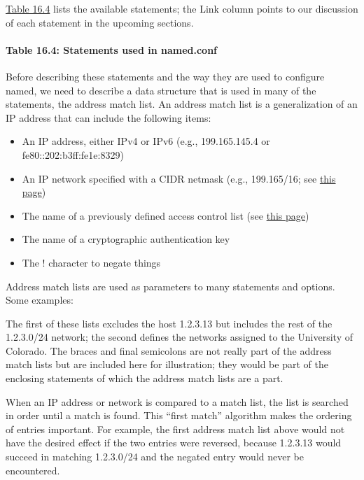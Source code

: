 \protect\hyperlink{part0024_split_035.htmlux5cux23_idTextAnchor896}{Table
16.4} lists the available statements; the Link column points to our
discussion of each statement in the upcoming sections.

\paragraph[{Table 16.4: }Statements used in
{named.conf}]{\texorpdfstring{{Table 16.4:
}\protect\hypertarget{part0024_split_035.htmlux5cux23_idTextAnchor896}{}{}Statements
used in {named.conf}}{Table 16.4: Statements used in named.conf}}


Before describing these statements and the way they are used to
configure {named}, we need to describe a data structure that is used in
many of the statements, the address match list. An address match list is
a generalization of an IP address that can include the following items:

\begin{itemize}
\tightlist
\item
  An IP address, either IPv4 or IPv6 (e.g., 199.165.145.4 or
  fe80::202:b3ff:fe1e:8329)
\item
  An IP network specified with a CIDR netmask (e.g., 199.165/16; see
  \protect\hyperlink{part0021_split_019.htmlux5cux23_idTextAnchor653}{this
  page})
\item
  The name of a previously defined access control list (see
  \protect\hyperlink{part0024_split_038.htmlux5cux23_idTextAnchor904}{this
  page})
\item
  The name of a cryptographic authentication key
\item
  The {!} character to negate things
\end{itemize}

Address match lists are used as parameters to many statements and
options. Some examples:


The first of these lists excludes the host 1.2.3.13 but includes the
rest of the 1.2.3.0/24 network; the second defines the networks assigned
to the University of Colorado. The braces and final semicolons are not
really part of the address match lists but are included here for
illustration; they would be part of the enclosing statements of which
the address match lists are a part.

When an IP address or network is compared to a match list, the list is
searched in order until a match is found. This ``first match'' algorithm
makes the ordering of entries important. For example, the first address
match list above would not have the desired effect if the two entries
were reversed, because 1.2.3.13 would succeed in matching 1.2.3.0/24 and
the negated entry would never be encountered.

